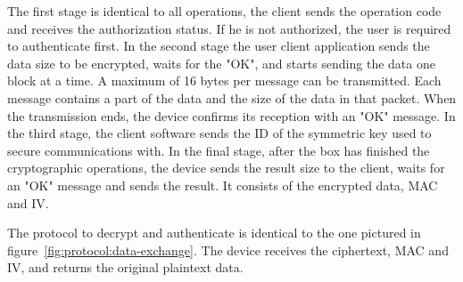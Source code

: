 The first stage is identical to all operations, the client sends the operation code and receives the authorization status. If he is not authorized, the user is required to authenticate first.
In the second stage the user client application sends the data size to be encrypted, waits for the "OK", and starts sending the data one block at a time.
A maximum of 16 bytes per message can be transmitted. Each message contains a part of the data and the size of the data in that packet. When the transmission ends, the device confirms its reception with an "OK" message.
In the third stage, the client software sends the ID of the symmetric key used to secure communications with.
In the final stage, after the box has finished the cryptographic operations, the device sends the result size to the client, waits for an "OK" message and sends the result. It consists of the encrypted data, MAC and IV.

The protocol to decrypt and authenticate is identical to the one pictured in figure~\ref{fig:protocol:data-exchange}. The device receives the ciphertext, \ac{MAC} and \ac{IV}, and returns the original plaintext data.

\hfill
\hfill

